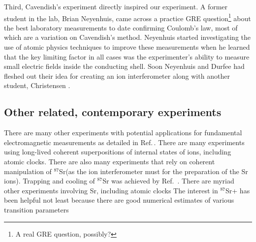 Third, Cavendish's experiment directly inspired our experiment.
A former student in the lab, Brian Neyenhuis, came across a practice GRE question\footnote{A real GRE question, possibly?} about the best laboratory measurements to date confirming Coulomb's law, most of which are a variation on Cavendish's method. Neyenhuis started investigating the use of atomic physics techniques to improve these measurements when he learned that the key limiting factor in all cases was the experimenter's ability to measure small electric fields inside the conducting shell. Soon Neyenhuis and Durfee had fleshed out their idea for creating an ion interferometer along with another student, Christensen \cite{NeyenhuisIon}\cite{christensen_arxiv_calcs}.  

\subsection{Other related, contemporary experiments}

There are many other experiments with potential applications for fundamental electromagnetic measurements as detailed in Ref.\,\cite{PhotonMassSurvey}. 
There are many experiments using long-lived coherent superpositions of internal states of ions, including atomic clocks\cite{Rosenband_ion_clock}.
There are also many experiments that rely on coherent manipulation of $^{87}$Sr(as the ion interferometer must for the preparation of the Sr ions). Trapping and cooling of $^{87}$Sr was achieved by Ref.~\cite{kurosu_trap_sr}. 
There are myriad other experiments involving Sr, including atomic clocks \cite{ludlow_science}
The interest in $^{87}$Sr+ has been helpful not least because there are good numerical estimates of various transition parameters \cite{safronovaTheory}
